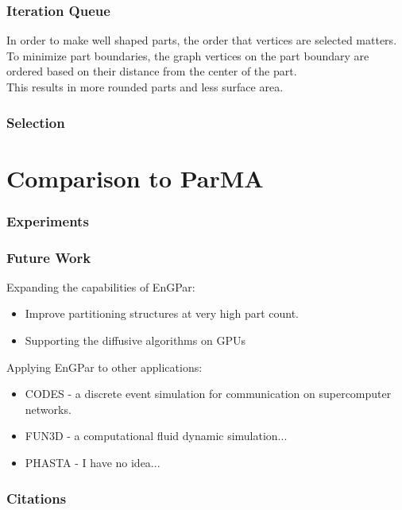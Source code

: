 \documentclass{beamer}
\begin{document}
\begin{frame}
  \frametitle{Iteration Queue}
  In order to make well shaped parts, the order that vertices are selected matters. \\
  \bigskip
  To minimize part boundaries, the graph vertices on the part boundary are ordered based on their distance from the center of the part. \\
  \bigskip
  This results in more rounded parts and less surface area. 
\end{frame}

\begin{frame}
  \frametitle{Selection}
  
\end{frame}

\section{Comparison to ParMA}

\begin{frame}
  \frametitle{Experiments}
\end{frame}


\begin{frame}
  \frametitle{Future Work}
  Expanding the capabilities of EnGPar:
  \begin{itemize}
    \item Improve partitioning structures at very high part count.
  \item Supporting the diffusive algorithms on GPUs
  \end{itemize}
  Applying EnGPar to other applications:
  \begin{itemize}
  \item CODES - a discrete event simulation for communication on supercomputer networks.
  \item FUN3D - a computational fluid dynamic simulation...
  \item PHASTA - I have no idea...
  \end{itemize}
\end{frame}

\begin{frame}
  \frametitle{Citations}
\end{frame}
  
\end{document}
